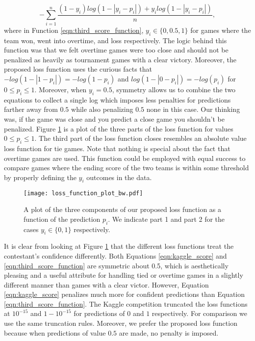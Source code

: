 \begin{equation}\label{eqn:third_score_function}
  -\sum_{i=1}^n\frac{(1-y_i)log(1-|y_i-p_i|) +y_ilog(1-|y_i-p_i|)}{n},
\end{equation} 
where in Function \ref{eqn:third_score_function}, $y_i \in \{0,0.5,1\}$ for games where the team won, went into overtime, and loss respectively. The logic behind this function was that we felt overtime games were too close and should not be penalized as heavily as tournament games with a clear victory. Moreover, the proposed loss function uses the curious facts that $-log(1-|1-p_i|) = - log(1-p_i)$ and $log(1- | 0 - p_i | ) = - log(p_i)$ for $0 \leq p_i \leq 1$. Moreover, when $y_i=0.5$, symmetry allows us to combine the two equations to collect a single log which imposes less penalties for predictions farther away from $0.5$ while also penalizing $0.5$ none in this case. Our thinking was, if the game was close and you predict a close game you shouldn't be penalized. Figure \ref{fig:scoring_functions} is a plot of the three parts of the loss function for values $0\leq p_i \leq 1$. The third part of the loss function closes resembles an absolute value loss function for tie games. Note that nothing is special about the fact that overtime games are used. This function could be employed with equal success to compare games where the ending score of the two teams is within some threshold by properly defining the $y_i$ outcomes in the data.   

\begin{figure}[H]
\centering
\texttt{[image: loss\_function\_plot\_bw.pdf]}
\caption{A plot of the three components of our proposed loss function as a function of the prediction $p_i$. We indicate part 1 and part 2 for the cases $y_i \in \{0,1\}$ respectively. }
\label{fig:scoring_functions}
\end{figure}

It is clear from looking at Figure \ref{fig:scoring_functions} that the different loss functions treat the contestant's confidence differently. Both Equations \ref{eqn:kaggle_score} and \ref{eqn:third_score_function} are symmetric about 0.5, which is aesthetically pleasing and a useful attribute for handling tied or overtime games in a slightly different manner than games with a clear victor. However, Equation \ref{eqn:kaggle_score} penalizes much more for confident predictions than Equation \ref{eqn:third_score_function}. The Kaggle competition truncated the loss functions at $10^{-15}$ and $1-10^{-15}$ for predictions of $0$ and $1$ respectively. For comparison we use the same truncation rules. Moreover, we prefer the proposed loss function because when predictions of value $0.5$ are made, no penalty is imposed. 

